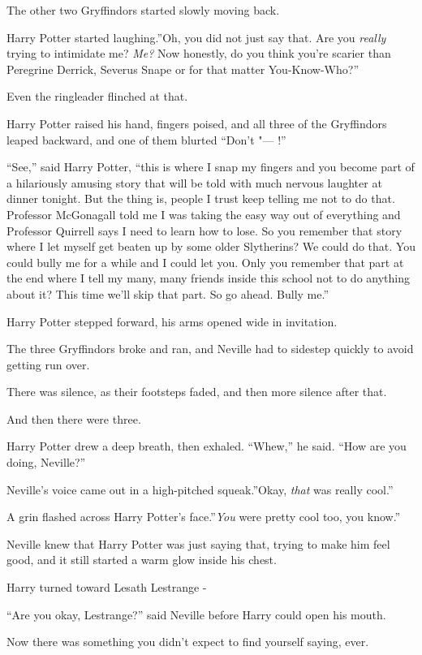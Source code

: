 The other two Gryffindors started slowly moving back.

Harry Potter started laughing.''Oh, you did not just say that. Are you
\emph{really} trying to intimidate me? \emph{Me?} Now honestly, do you
think you're scarier than Peregrine Derrick, Severus Snape or for that
matter You-Know-Who?''

Even the ringleader flinched at that.

Harry Potter raised his hand, fingers poised, and all three of the
Gryffindors leaped backward, and one of them blurted ``Don't "--- !''

``See,'' said Harry Potter, ``this is where I snap my fingers and you
become part of a hilariously amusing story that will be told with much
nervous laughter at dinner tonight. But the thing is, people I trust
keep telling me not to do that. Professor McGonagall told me I was
taking the easy way out of everything and Professor Quirrell says I need
to learn how to lose. So you remember that story where I let myself get
beaten up by some older Slytherins? We could do that. You could bully me
for a while and I could let you. Only you remember that part at the end
where I tell my many, many friends inside this school not to do anything
about it? This time we'll skip that part. So go ahead. Bully me.''

Harry Potter stepped forward, his arms opened wide in invitation.

The three Gryffindors broke and ran, and Neville had to sidestep quickly
to avoid getting run over.

There was silence, as their footsteps faded, and then more silence after
that.

And then there were three.

Harry Potter drew a deep breath, then exhaled. ``Whew,'' he said. ``How
are you doing, Neville?''

Neville's voice came out in a high-pitched squeak.''Okay, \emph{that}
was really cool.''

A grin flashed across Harry Potter's face.''\emph{You} were pretty cool
too, you know.''

Neville knew that Harry Potter was just saying that, trying to make him
feel good, and it still started a warm glow inside his chest.

Harry turned toward Lesath Lestrange -

``Are you okay, Lestrange?'' said Neville before Harry could open his
mouth.

Now there was something you didn't expect to find yourself saying, ever.

